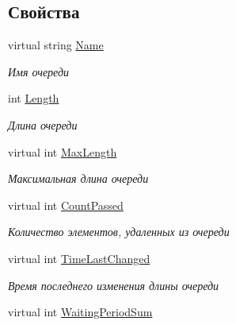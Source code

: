 \subsection*{Свойства}
\begin{DoxyCompactItemize}
\item 
virtual string \hyperlink{class_s_m_p_l_sharp_1_1_objects_1_1_smpl_queue_af8121cfdf0a8b265c860ae764af1ab33}{Name}
\begin{DoxyCompactList}\small\item\em Имя очереди \end{DoxyCompactList}\item 
int \hyperlink{class_s_m_p_l_sharp_1_1_objects_1_1_smpl_queue_a90750620f30441f6df56f42072648e45}{Length}
\begin{DoxyCompactList}\small\item\em Длина очереди \end{DoxyCompactList}\item 
virtual int \hyperlink{class_s_m_p_l_sharp_1_1_objects_1_1_smpl_queue_ac807329d1f3d17f6e651fc20ad50c06c}{Max\-Length}
\begin{DoxyCompactList}\small\item\em Максимальная длина очереди \end{DoxyCompactList}\item 
virtual int \hyperlink{class_s_m_p_l_sharp_1_1_objects_1_1_smpl_queue_aad1f14d3d385b42ab0312a20826040cb}{Count\-Passed}
\begin{DoxyCompactList}\small\item\em Количество элементов, удаленных из очереди \end{DoxyCompactList}\item 
virtual int \hyperlink{class_s_m_p_l_sharp_1_1_objects_1_1_smpl_queue_a93a68f8fefe39b5dafa2145e6ec3fa99}{Time\-Last\-Changed}
\begin{DoxyCompactList}\small\item\em Время последнего изменения длины очереди \end{DoxyCompactList}\item 
virtual int \hyperlink{class_s_m_p_l_sharp_1_1_objects_1_1_smpl_queue_ac51a6ce05e36a4e6bb32462339a172e6}{Waiting\-Period\-Sum}

\end{DoxyCompactItemize}

